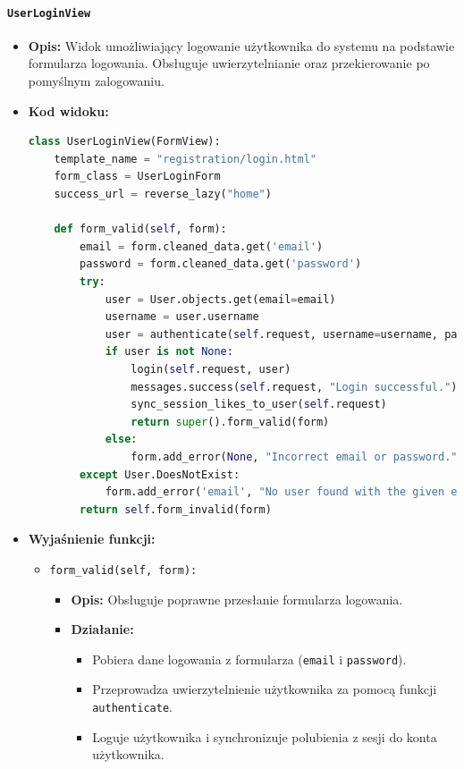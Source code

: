 \documentclass[12pt,a4paper,oneside]{article}
\theoremstyle{definition}
\numberwithin{equation}{section}
\begin{document}
\paragraph{\texttt{UserLoginView}}
\begin{itemize}
    \item \textbf{Opis:} Widok umożliwiający logowanie użytkownika do systemu na podstawie formularza logowania. Obsługuje uwierzytelnianie oraz przekierowanie po pomyślnym zalogowaniu.
    \item \textbf{Kod widoku:}
    \begin{lstlisting}[language=Python, caption=\texttt{UserLoginView}]
class UserLoginView(FormView):
    template_name = "registration/login.html"
    form_class = UserLoginForm
    success_url = reverse_lazy("home")

    def form_valid(self, form):
        email = form.cleaned_data.get('email')
        password = form.cleaned_data.get('password')
        try:
            user = User.objects.get(email=email)
            username = user.username
            user = authenticate(self.request, username=username, password=password)
            if user is not None:
                login(self.request, user)
                messages.success(self.request, "Login successful.")
                sync_session_likes_to_user(self.request)
                return super().form_valid(form)
            else:
                form.add_error(None, "Incorrect email or password.")
        except User.DoesNotExist:
            form.add_error('email', "No user found with the given email address.")
        return self.form_invalid(form)
    \end{lstlisting}

    \item \textbf{Wyjaśnienie funkcji:}
    \begin{itemize}
        \item \texttt{form\_valid(self, form):}
        \begin{itemize}
            \item \textbf{Opis:} Obsługuje poprawne przesłanie formularza logowania.
            \item \textbf{Działanie:}
            \begin{itemize}
                \item Pobiera dane logowania z formularza (\texttt{email} i \texttt{password}).
                \item Przeprowadza uwierzytelnienie użytkownika za pomocą funkcji \texttt{authenticate}.
                \item Loguje użytkownika i synchronizuje polubienia z sesji do konta użytkownika.
            \end{itemize}
        \end{itemize}


\end{itemize}
\end{itemize}
\end{document}
